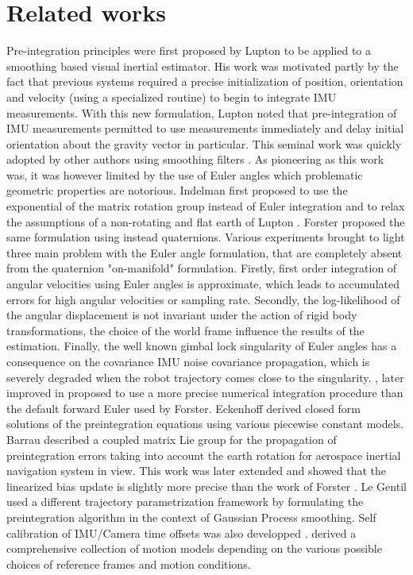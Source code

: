 \section{Related works}

Pre-integration principles were first proposed by Lupton \cite{lupton-09} to be applied to a smoothing based visual inertial estimator. His work was motivated partly 
by the fact that previous systems required a precise initialization of position, orientation and velocity (using a specialized routine) to begin to integrate IMU measurements. 
With this new formulation, Lupton noted that pre-integration of IMU measurements permitted to use measurements immediately and delay initial orientation about the gravity
vector in particular. 
This seminal work was quickly adopted by other authors using smoothing filters \cite{carlone2014eliminating}. As pioneering as this work was, it was however 
limited by the use of Euler angles which problematic geometric properties are notorious. Indelman \cite{Indelman-2013-7768} first proposed to use the exponential of the 
matrix rotation group instead of Euler integration and to relax the assumptions of a non-rotating and flat earth of Lupton \cite{lupton-09}. Forster \cite{forster2015imu, forster2017-TRO}
proposed the same formulation using instead quaternions. Various experiments brought to light three main problem with the Euler angle formulation, that are completely absent 
from the quaternion "on-manifold" formulation. Firstly, first order integration of angular velocities using Euler angles is approximate, which leads to accumulated errors 
for high angular velocities or sampling rate.  Secondly, the log-likelihood of the angular displacement is not invariant under the action of rigid body transformations, 
\eg the choice of the world frame influence the results of the estimation. Finally, the well known gimbal lock singularity of Euler angles has a consequence 
on the covariance IMU noise covariance propagation, which is severely degraded when the robot trajectory comes close to the singularity. 
\cite{shen2015tightly}, later improved in \cite{qin2018vins} proposed to use a more precise numerical integration procedure than the default forward Euler used by Forster. 
Eckenhoff \cite{eckenhoff2019closed} derived closed form solutions of the preintegration equations using various piecewise constant models.
Barrau \cite{barrau2020mathematical} described a coupled matrix Lie group for the propagation of preintegration errors taking into account the earth rotation for aerospace
inertial navigation system in view. This work was later extended \cite{brossard2021associating} and showed that the linearized bias update is slightly more precise than 
the work of Forster \cite{forster2017-TRO}. Le Gentil \cite{le2020gaussian} used a different trajectory parametrization framework by formulating the preintegration algorithm 
in the context of Gaussian Process smoothing. Self calibration of IMU/Camera time offsets was also developped \cite{yang2020analytic}. 
\cite{luo2021unified} derived a comprehensive collection of motion models depending on the various possible choices of reference frames and motion conditions. 

